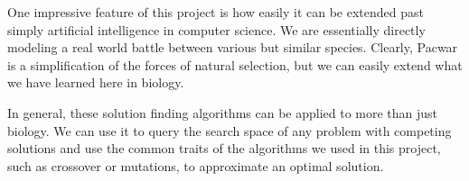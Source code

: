 \documentclass[twoside]{article}
\begin{document}
\begin{multicols}{2}
One impressive feature of this project is how easily it can be extended past simply artificial intelligence in computer science. We are essentially directly modeling a real world battle between various but similar species. Clearly, Pacwar is a simplification of the forces of natural selection, but we can easily extend what we have learned here in biology. 

In general, these solution finding algorithms can be applied to more than just biology. We can use it to query the search space of any problem with competing solutions and use the common traits of the algorithms we used in this project, such as crossover or mutations, to approximate an optimal solution. 

\end{multicols}
\end{document}
